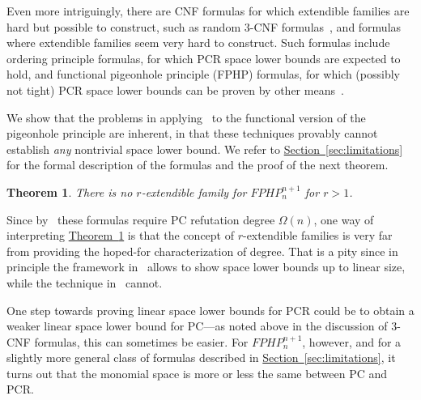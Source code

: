 \documentclass[11pt]{article}
\numberwithin{equation}{section}
\newtheorem{theorem}{Theorem}[section]
\theoremstyle{definition}
\theoremstyle{plain}
\newcommand{\expref}[2]{\hyperref[#2]{#1~\ref{#2}}}
\theoremstyle{plain}
\theoremstyle{definition}
\newcommand{\refth}[1]{\expref{Theorem}{#1}}
\newcommand{\refsec}[1]{\expref{Section}{#1}}
\newcommand{\bigtheta}[1]{\Theta ( #1 )}
\newcommand{\bigomega}[1]{\Omega ( #1 )}
\newcommand{\proofsystemsubindexformat}[1]{\scriptscriptstyle{\mathcal{#1}}}
\newcommand{\pcnot}{\proofsystemsubindexformat{PC}}
\newcommand{\pcrnot}{\proofsystemsubindexformat{PCR}}
\newcommand{\derivabbrevsmall}[2]{( #1 \vdash #2 )}
\newcommand{\refutabbrevsmall}[1]{\derivabbrevsmall{#1}{\!\bot}}
\newcommand{\genericrefsmall}[3]{{\mathit{#1}}_{#2}\refutabbrevsmall{#3}}
\newcommand{\mspaceref}[2][]{\genericrefsmall{Sp}{#1}{#2}}
\newcommand{\formulaformat}[1]{\mathit{#1}}
\newcommand{\fphpnot}[2]{\formulaformat{FPHP}^{#1}_{#2}}
\newcommand{\kextendiblenot}{r}
\newcommand{\kextendible}{\mbox{$\kextendiblenot$-ex}\-tend\-ible\xspace}
\newcommand{\kextendibleNok}{extendible\xspace}
\begin{document}
Even more intriguingly, there are CNF formulas for which
\kextendibleNok families are hard but possible to construct, such as
random $3$-CNF formulas~\cite{BBGHMW17SpaceProofCplx}, and formulas
where \kextendibleNok families seem very hard to construct. Such
formulas include ordering principle formulas, for which PCR space
lower bounds are expected to hold, and functional pigeonhole principle
(FPHP) formulas, for which (possibly not tight) PCR space lower bounds
can be proven by other means~\cite{GKT19SpaceWidth}.

We show that the problems in applying~%
\cite{BG15Framework}
to the functional version of the pigeonhole principle are inherent, 
in that these techniques provably cannot establish
%
\emph{any} nontrivial
space lower bound.
%
We refer to
 \refsec{sec:limitations}
%
  for the formal description of the formulas
  and
%
%
%
  the proof of the 
  next theorem.

\begin{theorem}
  \label{th:no-kextendible}
  There is no \kextendible family for
  $\fphpnot{n+1}{n}$ 
%
  for
  $\kextendiblenot>1$. 
\end{theorem}
  
%
%
%
%
%
%
%
%
%
%
%
%
%
%
%
%
%
%
%
%
%
%
%
%
%
%
%
%
%
%
%

Since by~\cite{Razborov98LowerBound,MN15GeneralizedMethodDegree}
these formulas
require PC refutation
degree $\bigomega{n}$, one way of interpreting
\refth{th:no-kextendible} is that the concept of \kextendible families
is very far from providing the hoped-for characterization of degree.
%
That is a pity since in principle the framework
in~\cite{BG15Framework} allows to show space lower bounds up to linear
size, while the technique in~\cite{GKT19SpaceWidth} cannot.

One step towards proving linear space lower bounds for PCR could be to
obtain a weaker linear space lower bound for PC---as noted above in
the discussion of \mbox{$3$-CNF} formulas, this can sometimes
be easier.
%
For
$\fphpnot{n+1}{n}$,
%
however,
and for a slightly more general class of formulas
described in
 \refsec{sec:limitations},
%
%
%
%
it turns out that the monomial space is more or less the same
between PC and PCR.

%

\end{document}
